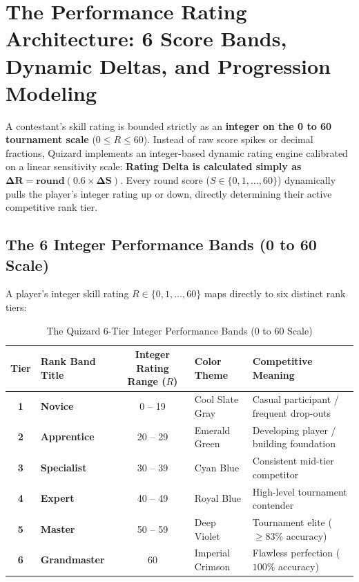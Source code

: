 \chapter{The Performance Rating Architecture: 6 Score Bands, Dynamic Deltas, and Progression Modeling}

\begin{tcolorbox}[storybox, title={The Rating Engine in Brief}]
A contestant's skill rating is bounded strictly as an \textbf{integer on the 0 to 60 tournament scale} ($0 \le R \le 60$). Instead of raw score spikes or decimal fractions, Quizard implements an integer-based dynamic rating engine calibrated on a linear sensitivity scale: \textbf{Rating Delta is calculated simply as $\mathbf{\Delta R = \text{round}(0.6 \times \Delta S)}$}. Every round score ($S \in \{0, 1, \dots, 60\}$) dynamically pulls the player's integer rating up or down, directly determining their active competitive rank tier.
\end{tcolorbox}

\section{The 6 Integer Performance Bands (0 to 60 Scale)}
A player's integer skill rating $R \in \{0, 1, \dots, 60\}$ maps directly to six distinct rank tiers:

\begin{table}[htbp]
\centering
\footnotesize
\begin{tabular}{|c|l|c|l|p{5.2cm}|}
\hline
\rowcolor{primaryBlue!15}
\textbf{Tier} & \textbf{Rank Band Title} & \textbf{Integer Rating Range ($R$)} & \textbf{Color Theme} & \textbf{Competitive Meaning} \\ \hline
\textbf{1} & \textbf{Novice} & 0 -- 19 & Cool Slate Gray & Casual participant / frequent drop-outs \\ \hline
\textbf{2} & \textbf{Apprentice} & 20 -- 29 & Emerald Green & Developing player / building foundation \\ \hline
\textbf{3} & \textbf{Specialist} & 30 -- 39 & Cyan Blue & Consistent mid-tier competitor \\ \hline
\textbf{4} & \textbf{Expert} & 40 -- 49 & Royal Blue & High-level tournament contender \\ \hline
\textbf{5} & \textbf{Master} & 50 -- 59 & Deep Violet & Tournament elite ($\ge 83\%$ accuracy) \\ \hline
\textbf{6} & \textbf{Grandmaster} & 60 & Imperial Crimson & Flawless perfection ($100\%$ accuracy) \\ \hline
\end{tabular}
\caption{The Quizard 6-Tier Integer Performance Bands (0 to 60 Scale)}
\end{table}

